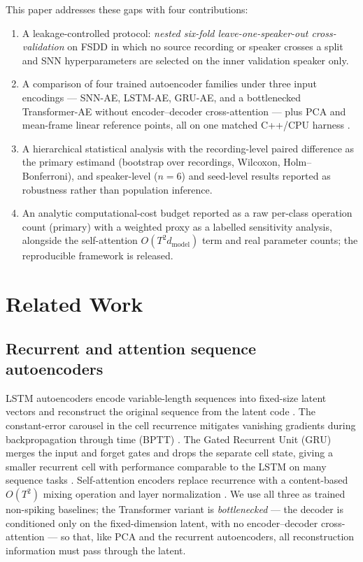 \documentclass[conference]{IEEEtran}
\begin{document}
\par This paper addresses these gaps with four contributions:
\begin{enumerate}
  \item A leakage-controlled protocol: \emph{nested six-fold
        leave-one-speaker-out cross-validation} on FSDD \cite{jackson2018fsdd}
        in which no source recording or speaker crosses a split and SNN
        hyperparameters are selected on the inner validation speaker only.
  \item A comparison of four trained autoencoder families under three input
        encodings --- SNN-AE, LSTM-AE, GRU-AE, and a bottlenecked
        Transformer-AE without encoder--decoder cross-attention --- plus PCA
        and mean-frame linear reference points, all on one matched C++/CPU
        harness \cite{furlan2026doi,xtensor}.
  \item A hierarchical statistical analysis with the recording-level paired
        difference as the primary estimand (bootstrap over recordings, Wilcoxon,
        Holm--Bonferroni), and speaker-level ($n=6$) and seed-level results
        reported as robustness rather than population inference.
  \item An analytic computational-cost budget reported as a raw per-class
        operation count (primary) with a weighted proxy as a labelled
        sensitivity analysis, alongside the self-attention
        $O(T^2 d_{\mathrm{model}})$ term and real parameter counts; the
        reproducible framework is released.
\end{enumerate}

\section{Related Work}

\subsection{Recurrent and attention sequence autoencoders}
\par LSTM autoencoders encode variable-length sequences into fixed-size latent
vectors and reconstruct the original sequence from the latent code
\cite{sutskever2014sequence,hochreiter1997long}. The constant-error carousel in
the cell recurrence mitigates vanishing gradients during backpropagation through
time (BPTT) \cite{werbos1990backpropagation,greff2017lstm}. The Gated Recurrent
Unit (GRU) \cite{cho2014gru} merges the input and forget gates and drops the
separate cell state, giving a smaller recurrent cell with performance
comparable to the LSTM on many sequence tasks \cite{chung2014gru}. Self-attention
encoders \cite{vaswani2017attention} replace recurrence with a content-based
$O(T^2)$ mixing operation and layer normalization \cite{ba2016layernorm}. We
use all three as trained non-spiking baselines; the Transformer variant is
\emph{bottlenecked} --- the decoder is conditioned only on the fixed-dimension
latent, with no encoder--decoder cross-attention --- so that, like PCA and the
recurrent autoencoders, all reconstruction information must pass through the
latent.
\end{document}
